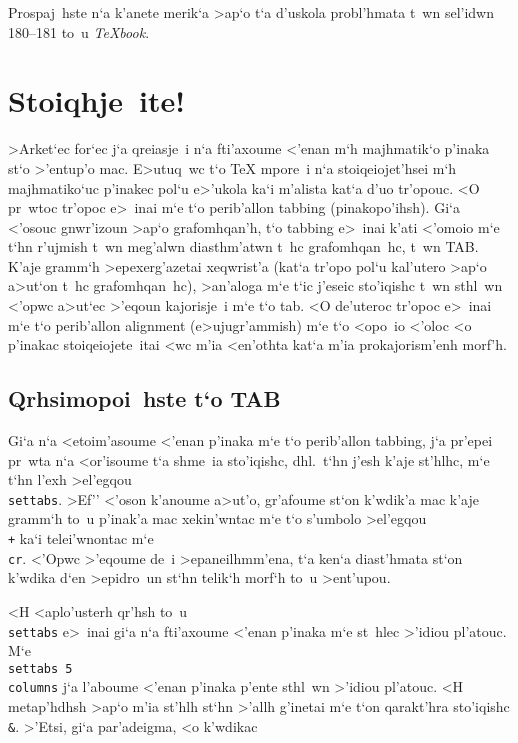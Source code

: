 \exercise Prospaj~hste n`a k'anete merik`a >ap`o t`a d'uskola
probl'hmata t~wn sel'idwn 180--181 to~u {\sl \TeX book}.


\section{Stoiqhje~ite!}        

>Arket`ec for`ec j`a qreiasje~i n`a fti'axoume <'enan m`h majhmatik`o
p'inaka st`o >'entup'o mac.  E>utuq~wc t`o {\rm \TeX} mpore~i n`a
stoiqeiojet'hsei m`h majhmatiko`uc p'inakec pol`u e>'ukola ka`i m'alista
kat`a d'uo tr'opouc.  <O pr~wtoc tr'opoc e>~inai m`e t`o {\tengs
perib'allon} {\rm tabbing} (pinakopo'ihsh).  Gi`a <'osouc gnwr'izoun
>ap`o grafomhqan'h, t`o {\rm tabbing}  e>~inai k'ati <'omoio m`e t`hn
r'ujmish t~wn meg'alwn diasthm'atwn t~hc grafomhqan~hc, t~wn {\rm
TAB}\null.  K'aje gramm`h >epexerg'azetai xeqwrist'a (kat`a tr'opo pol`u
kal'utero >ap`o a>ut`on t~hc grafomhqan~hc), >an'aloga m`e t`ic j'eseic
sto'iqishc t~wn sthl~wn <'opwc a>ut`ec >'eqoun kajorisje~i m`e t`o {\rm
tab}.  <O de'uteroc tr'opoc  e>~inai m`e t`o {\tengs perib'allon} {\rm
alignment} (e>ujugr'ammish) m`e t`o <opo~io <'oloc <o p'inakac
stoiqeiojete~itai <wc m'ia <en'othta kat`a m'ia prokajorism'enh morf'h.

\subsection{Qrhsimopoi~hste  t`o {\lsecfont TAB}}         
        
Gi`a n`a <etoim'asoume <'enan p'inaka m`e t`o perib'allon {\rm tabbing},
j`a pr'epei pr~wta n`a <or'isoume t`a shme~ia sto'iqishc, dhl.\ t`hn
j'esh k'aje st'hlhc, m`e t`hn l'exh >el'egqou {\tt \\settabs}.         
>Ef'' <'oson k'anoume a>ut'o, gr'afoume st`on k'wdik'a mac k'aje gramm`h
to~u p'inak'a mac xekin'wntac m`e t`o s'umbolo >el'egqou {\tt \\+} ka`i
telei'wnontac m`e {\tt \\cr}.  <'Opwc >'eqoume de~i >epaneilhm\-m'ena,
t`a ke\-n`a diast'hmata st`on k'wdika d`en >epidro~un st`hn telik`h
morf`h to~u >ent'upou.

<H <aplo'usterh qr'hsh to~u {\tt \\settabs} e>~inai gi`a n`a fti'axoume
<'enan p'inaka m`e st~hlec >'idiou pl'atouc. M`e {\tt
\\settabs 5 \\columns} j`a l'aboume <'enan p'inaka p'ente sthl~wn
>'idiou pl'atouc.  <H metap'hdhsh >ap`o m'ia st'hlh st`hn >'allh
g'inetai m`e t`on qarakt'hra sto'iqishc {\tt\&}\null.  >'Etsi, gi`a
par'adeigma, <o k'wdikac 

